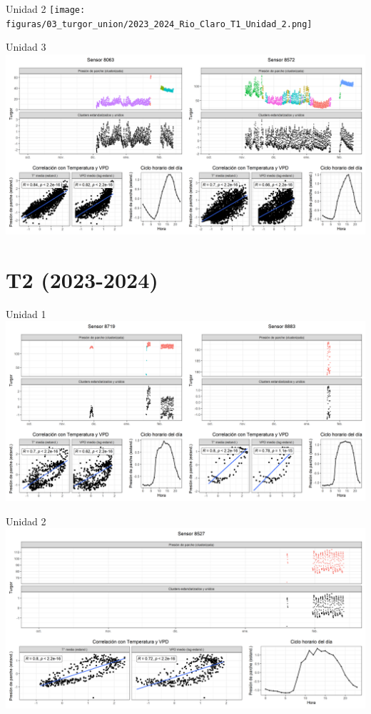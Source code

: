 \documentclass[
  letterpaper,
  DIV=11,
  numbers=noendperiod]{scrreprt}
\begin{document}
Unidad 2
\texttt{[image: figuras/03\_turgor\_union/2023\_2024\_Rio\_Claro\_T1\_Unidad\_2.png]}

Unidad 3
\includegraphics{figuras/03_turgor_union/2023_2024_Rio_Claro_T1_Unidad_3.png}

\chapter{T2 (2023-2024)}

Unidad 1
\includegraphics{figuras/03_turgor_union/2023_2024_Rio_Claro_T2_Unidad_1.png}

Unidad 2
\includegraphics{figuras/03_turgor_union/2023_2024_Rio_Claro_T2_Unidad_2.png}
\end{document}
